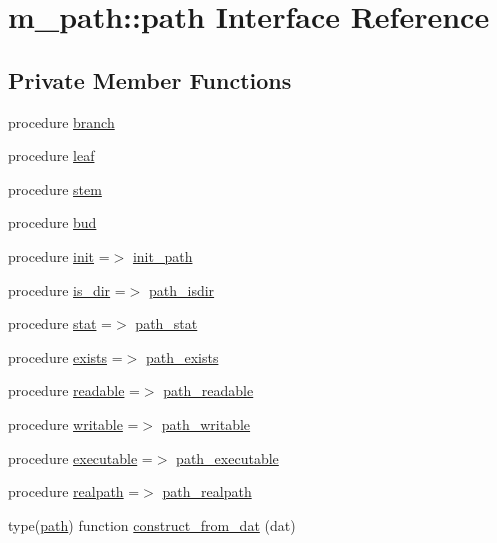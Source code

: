 \hypertarget{structm__path_1_1path}{}\section{m\+\_\+path\+:\+:path Interface Reference}
\label{structm__path_1_1path}
\subsection*{Private Member Functions}
\begin{DoxyCompactItemize}
\item 
procedure \mbox{\hyperlink{structm__path_1_1path_a51ab53ea8780aa950701aa63de109bb5}{branch}}
\item 
procedure \mbox{\hyperlink{structm__path_1_1path_ac48a286ac54ce081ff8f757bc7724c8d}{leaf}}
\item 
procedure \mbox{\hyperlink{structm__path_1_1path_a9f4b8368bb43f15d23ba5b17b3b3b901}{stem}}
\item 
procedure \mbox{\hyperlink{structm__path_1_1path_a461f618573516bd745e802f829db588a}{bud}}
\item 
procedure \mbox{\hyperlink{structm__path_1_1path_a4072d4f0862ea6a73c0bcea59e356b40}{init}} =$>$ \mbox{\hyperlink{namespacem__path_ad3027220a3a7decb9dd35ddb41a91250}{init\+\_\+path}}
\item 
procedure \mbox{\hyperlink{structm__path_1_1path_ab9edbe441902b825c575010bd1b8a976}{is\+\_\+dir}} =$>$ \mbox{\hyperlink{namespacem__path_a4e56f4f3db67378cb4f20340a14f4a0f}{path\+\_\+isdir}}
\item 
procedure \mbox{\hyperlink{structm__path_1_1path_a69cc8aabf4b8530c82bd133fd641227b}{stat}} =$>$ \mbox{\hyperlink{namespacem__path_a44b09269412e4291dce9ce87de5f6d8f}{path\+\_\+stat}}
\item 
procedure \mbox{\hyperlink{structm__path_1_1path_a008fa6fc2b63421b3c44c41ed3bf0434}{exists}} =$>$ \mbox{\hyperlink{namespacem__path_a1d3741add7dd7d180b71295c4a1761c6}{path\+\_\+exists}}
\item 
procedure \mbox{\hyperlink{structm__path_1_1path_a77ab9b34be0db684654d1f1b375d2f9e}{readable}} =$>$ \mbox{\hyperlink{namespacem__path_a9e5b51fcb0d98f8a711b9bfbcaa39c66}{path\+\_\+readable}}
\item 
procedure \mbox{\hyperlink{structm__path_1_1path_a2769cf5ecff4b5dc0a6b82bd79a18c37}{writable}} =$>$ \mbox{\hyperlink{namespacem__path_a27ad0b81b3aedd309035fe3dc4d69128}{path\+\_\+writable}}
\item 
procedure \mbox{\hyperlink{structm__path_1_1path_aef5ccbd9f037749751a4ece14ab91bc0}{executable}} =$>$ \mbox{\hyperlink{namespacem__path_abcf12fcdc2f3d90663783ff774b25261}{path\+\_\+executable}}
\item 
procedure \mbox{\hyperlink{structm__path_1_1path_a2face141118fc136a54b08f2b46738bb}{realpath}} =$>$ \mbox{\hyperlink{namespacem__path_a54bcb3564054f6540a65dc32354f2a2d}{path\+\_\+realpath}}
\item 
type(\mbox{\hyperlink{structm__path_1_1path}{path}}) function \mbox{\hyperlink{structm__path_1_1path_ae5fad3370033619ca8935281119a38de}{construct\+\_\+from\+\_\+dat}} (dat)
\end{DoxyCompactItemize}
